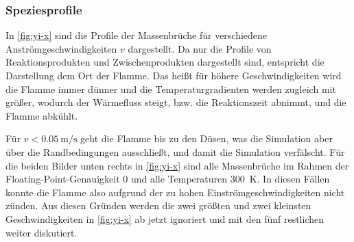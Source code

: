 %

\subsubsection{Speziesprofile}
\label{sct:oppdiffLe1-yi-z}

In \autoref{fig:yi-x} sind die Profile der Massenbrüche für verschiedene Anströmgeschwindigkeiten $v$ dargestellt. Da nur die Profile von Reaktionsprodukten und Zwischenprodukten dargestellt sind, entspricht die Darstellung dem Ort der Flamme. Das heißt für höhere Geschwindigkeiten wird die Flamme immer dünner und die Temperaturgradienten werden zugleich mit größer, wodurch der Wärmefluss steigt, bzw. die Reaktionszeit abnimmt, und die Flamme abkühlt.

Für $v<\SI{0.05}{\meter\per\second}$ geht die Flamme bis zu den Düsen, was die Simulation aber über die Randbedingungen ausschließt, und damit die Simulation verfälscht.
Für die beiden Bilder unten rechts in \autoref{fig:yi-x} sind alle Massenbrüche im Rahmen der Floating-Point-Genauigkeit $0$ und alle Temperaturen \SI{300}{\kelvin}. In diesen Fällen konnte die Flamme also aufgrund der zu hohen Einströmgeschwindigkeiten nicht zünden.
Aus diesen Gründen werden die zwei größten und zwei kleinsten Geschwindigkeiten in \autoref{fig:yi-x} ab jetzt ignoriert und mit den fünf restlichen weiter diskutiert.

